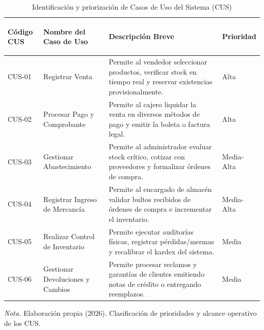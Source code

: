 \begin{table}[H]
    \centering
    \caption{Identificaci\'on y priorizaci\'on de Casos de Uso del Sistema (CUS)}
    \label{tab:cus_prioridades}
    \begin{tabularx}{\textwidth}{|>{\bfseries\raggedright\arraybackslash}p{2.0cm}|>{\raggedright\arraybackslash}p{3.2cm}|X|>{\centering\arraybackslash}p{2.2cm}|}
        \hline
        Código CUS & Nombre del Caso de Uso & Descripción Breve & Prioridad \\
        \hline
        CUS-01 & Registrar Venta & Permite al vendedor seleccionar productos, verificar stock en tiempo real y reservar existencias provisionalmente. & Alta \\
        \hline
        CUS-02 & Procesar Pago y Comprobante & Permite al cajero liquidar la venta en diversos métodos de pago y emitir la boleta o factura legal. & Alta \\
        \hline
        CUS-03 & Gestionar Abastecimiento & Permite al administrador evaluar stock crítico, cotizar con proveedores y formalizar órdenes de compra. & Media-Alta \\
        \hline
        CUS-04 & Registrar Ingreso de Mercancía & Permite al encargado de almacén validar bultos recibidos de órdenes de compra e incrementar el inventario. & Media-Alta \\
        \hline
        CUS-05 & Realizar Control de Inventario & Permite ejecutar auditorías físicas, registrar pérdidas/mermas y recalibrar el kardex del sistema. & Media \\
        \hline
        CUS-06 & Gestionar Devoluciones y Cambios & Permite procesar reclamos y garantías de clientes emitiendo notas de crédito o entregando reemplazos. & Media \\
        \hline
    \end{tabularx}
    \par\vspace{1ex}
    {\raggedright \small \emph{Nota.} Elaboración propia (2026). Clasificación de prioridades y alcance operativo de los CUS.\par}
\end{table}

